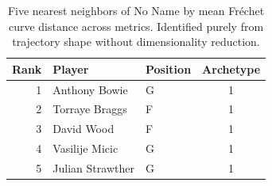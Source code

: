 \begin{table}[htbp]
  \centering\small
  \begin{tabular}{rllc}
    \toprule
    Rank & Player & Position & Archetype \\
    \midrule
    1 & Anthony Bowie & G & 1 \\
    2 & Torraye Braggs & F & 1 \\
    3 & David Wood & F & 1 \\
    4 & Vasilije Micic & G & 1 \\
    5 & Julian Strawther & G & 1 \\
    \bottomrule
  \end{tabular}
  \caption{Five nearest neighbors of No Name by mean Fr\'{e}chet curve distance across metrics. Identified purely from trajectory shape without dimensionality reduction.}
\end{table}


